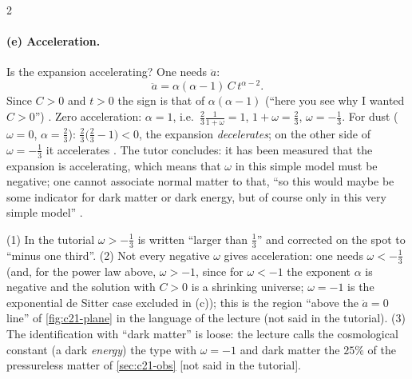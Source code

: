 \begin{paracol}{2}
\paragraph{(e) Acceleration.} Is the expansion accelerating? One needs $\ddot a$:
\[
  \ddot a=\alpha(\alpha-1)\,C\,t^{\alpha-2}.
\]
Since $C>0$ and $t>0$ the sign is that of $\alpha(\alpha-1)$ (``here you see why I wanted $C>0$'') . Zero acceleration: $\alpha=1$, i.e.\ $\tfrac23\frac1{1+\omega}=1$, $1+\omega=\tfrac23$, $\omega=-\tfrac13$. For dust ($\omega=0$, $\alpha=\tfrac23$): $\tfrac23\bigl(\tfrac23-1\bigr)<0$, the expansion \emph{decelerates}; on the other side of $\omega=-\tfrac13$ it accelerates . The tutor concludes: it has been measured that the expansion is accelerating, which means that $\omega$ in this simple model must be negative; one cannot associate normal matter to that, ``so this would maybe be some indicator for dark matter or dark energy, but of course only in this very simple model'' .
\begin{coursenote}
(1) In the tutorial $\omega>-\tfrac13$ is written ``larger than $\tfrac13$'' and corrected on the spot to ``minus one third''. (2) Not every negative $\omega$ gives acceleration: one needs $\omega<-\tfrac13$ (and, for the power law above, $\omega>-1$, since for $\omega<-1$ the exponent $\alpha$ is negative and the solution with $C>0$ is a shrinking universe; $\omega=-1$ is the exponential de Sitter case excluded in (c)); this is the region ``above the $\ddot a=0$ line'' of \cref{fig:c21-plane} in the language of the lecture (not said in the tutorial). (3) The identification with ``dark matter'' is loose: the lecture calls the cosmological constant (a dark \emph{energy}) the type with $\omega=-1$ and dark matter the $25\%$ of the pressureless matter of \cref{sec:c21-obs} [not said in the tutorial].
\end{coursenote}


\end{paracol}
